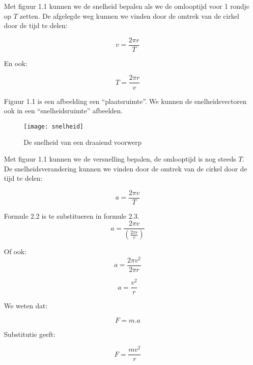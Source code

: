Met figuur 1.1 kunnen we de snelheid bepalen als we de omlooptijd
voor 1 rondje op $T$ zetten. De afgelegde weg kunnen we vinden door
de omtrek van de cirkel door de tijd te delen:

\begin{equation}
v=\frac{2\pi r}{T}
\end{equation}


En ook:

\begin{equation}
T=\frac{2\pi r}{v}
\end{equation}


Figuur 1.1 is een afbeelding een ``plaatsruimte''. We kunnen de
snelheidsvectoren ook in een ``snelheidsruimte'' afbeelden.

\begin{figure}[H]
\noindent \begin{centering}
\texttt{[image: snelheid]}
\par\end{centering}

\caption{De snelheid van een draaiend voorwerp}
\end{figure}


Met figuur 1.1 kunnen we de versnelling bepalen, de omlooptijd is
nog steeds $T$. De snelheidsverandering kunnen we vinden door de
omtrek van de cirkel door de tijd te delen:

\begin{equation}
a=\frac{2\pi v}{T}
\end{equation}


Formule 2.2 is te substitueren in formule 2.3.
\begin{equation}
a=\frac{2\pi v}{(\frac{2\pi r}{v})}
\end{equation}


Of ook:
\begin{equation}
a=\frac{2\pi v^{2}}{2\pi r}
\end{equation}


\begin{equation}
a=\frac{v^{2}}{r}
\end{equation}


We weten dat:

\begin{equation}
F=m.a
\end{equation}


Substitutie geeft:

\begin{equation}
F=\frac{mv^{2}}{r}
\end{equation}


